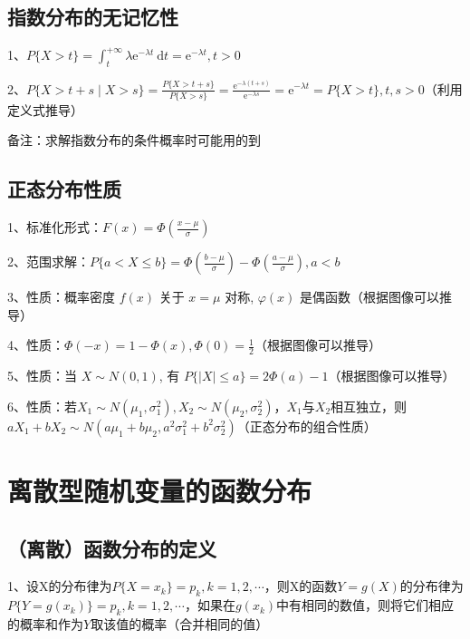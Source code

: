 \subsection{指数分布的无记忆性}

1、$ P\{X>t\}=\int_{t}^{+\infty} \lambda \mathrm{e}^{-\lambda t} \mathrm{~d} t=\mathrm{e}^{-\lambda t}, t>0 $

2、$ P\{X>t+s \mid X>s\}=\frac{P\{X>t+s\}}{P\{X>s\}}=\frac{\mathrm{e}^{-\lambda(t+s)}}{\mathrm{e}^{-\lambda s}}=\mathrm{e}^{-\lambda t}=P\{X>t\}, t, s>0 $（利用定义式推导）

备注：求解指数分布的条件概率时可能用的到



\subsection{正态分布性质}

1、标准化形式：$ F(x)=\Phi\left(\frac{x-\mu}{\sigma}\right) $

2、范围求解：$ P\{a<X \leqslant b\}=\Phi\left(\frac{b-\mu}{\sigma}\right)-\Phi\left(\frac{a-\mu}{\sigma}\right), a<b $

3、性质：概率密度 $ f(x) $ 关于 $ x=\mu $ 对称, $ \varphi(x) $ 是偶函数（根据图像可以推导）

4、性质：$ \Phi(-x)=1-\Phi(x), \Phi(0)=\frac{1}{2} $（根据图像可以推导）

5、性质：当 $ X \sim N(0,1) $, 有 $ P\{|X| \leqslant a\}=2 \Phi(a)-1 $（根据图像可以推导）

6、性质：若$ X_{1} \sim N\left(\mu_{1}, \sigma_{1}^{2}\right), X_{2} \sim N\left(\mu_{2}, \sigma_{2}^{2}\right) $，$ X_{1} $与$ X_{2} $相互独立，则$ a X_{1}+b X_{2} \sim N\left(a \mu_{1}+b \mu_{2}, a^{2} \sigma_{1}^{2}+b^{2} \sigma_{2}^{2}\right) $（正态分布的组合性质）

\section{离散型随机变量的函数分布}



\subsection{（离散）函数分布的定义}

1、设X的分布律为$ P\{X=x_k\}=p_k,k=1,2,\cdots $，则X的函数$ Y=g(X) $的分布律为$ P\{Y=g(x_k)\}=p_k,k=1,2,\cdots $，如果在$ g(x_k) $中有相同的数值，则将它们相应的概率和作为$ Y $取该值的概率（合并相同的值）



